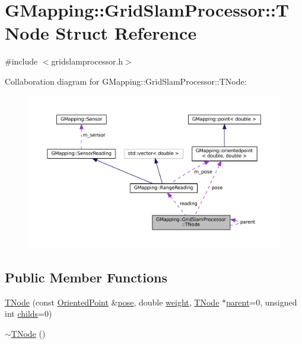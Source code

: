 \hypertarget{structGMapping_1_1GridSlamProcessor_1_1TNode}{}\section{G\+Mapping\+:\+:Grid\+Slam\+Processor\+:\+:T\+Node Struct Reference}
\label{structGMapping_1_1GridSlamProcessor_1_1TNode}


{\ttfamily \#include $<$gridslamprocessor.\+h$>$}



Collaboration diagram for G\+Mapping\+:\+:Grid\+Slam\+Processor\+:\+:T\+Node\+:
\nopagebreak
\begin{figure}[H]
\begin{center}
\leavevmode
\includegraphics[width=350pt]{structGMapping_1_1GridSlamProcessor_1_1TNode__coll__graph}
\end{center}
\end{figure}
\subsection*{Public Member Functions}
\begin{DoxyCompactItemize}
\item 
\hyperlink{structGMapping_1_1GridSlamProcessor_1_1TNode_a7742a4335c17d489467af9bbd21334ef}{T\+Node} (const \hyperlink{structGMapping_1_1orientedpoint}{Oriented\+Point} \&\hyperlink{structGMapping_1_1GridSlamProcessor_1_1TNode_a00ffad9f49ae467746aa211fbfaf4523}{pose}, double \hyperlink{structGMapping_1_1GridSlamProcessor_1_1TNode_ab30d02945ab4cba987bbc428f87b3028}{weight}, \hyperlink{structGMapping_1_1GridSlamProcessor_1_1TNode}{T\+Node} $\ast$\hyperlink{structGMapping_1_1GridSlamProcessor_1_1TNode_aa96443473844405f417fb8170b3d7243}{parent}=0, unsigned int \hyperlink{structGMapping_1_1GridSlamProcessor_1_1TNode_a4c15378fddd812b0376ceb81c43be3e0}{childs}=0)
\item 
\hyperlink{structGMapping_1_1GridSlamProcessor_1_1TNode_a22b5e02c6b9dc2139f63652d8b0d57c5}{$\sim$\+T\+Node} ()
\end{DoxyCompactItemize}
